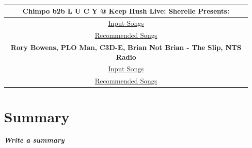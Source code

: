 \begin{center}
	\begin{tabular}{ |c|} 
		\hline
		\textbf{Chimpo b2b L U C Y @ Keep Hush Live: Sherelle Presents:}\\ 
		\hline \href{https://open.spotify.com/playlist/5bY204xBviDYYDBZQFHj6D?si=f6571fedce8f40c8}{Input Songs}\\
		\hline \href{https://open.spotify.com/playlist/0a4NB3IakYdbjNZlUWrEPd?si=b6660a4adf1f4183}{Recommended Songs}\\
		\hline \textbf{Rory Bowens, PLO Man, C3D-E, Brian Not Brian - The Slip, NTS Radio}\\ 
		\hline \href{https://open.spotify.com/playlist/0i4DAcdhMWRwNui9dHnb1i?si=7ea9e25236d84162}{Input Songs}\\
		\hline \href{https://open.spotify.com/playlist/3SMcwF0GxUtV4LuXKmvypt?si=6c0b136d8a104f80}{Recommended Songs}\\
		\hline
	\end{tabular}
\end{center}

\section{Summary}
\textbf{\textit{Write a summary}}


